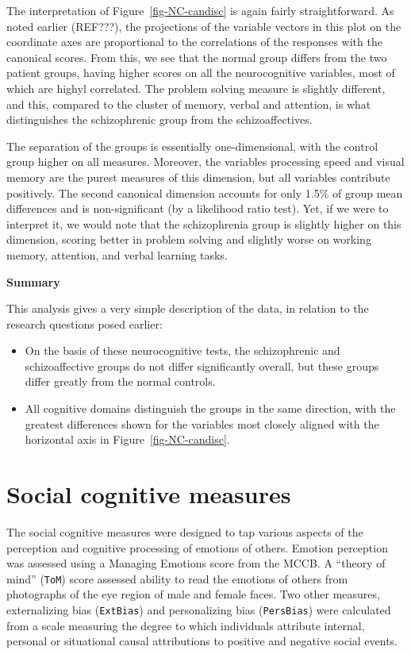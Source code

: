\documentclass[
  letterpaper,
  10pt,
  krantz2]{krantz}
\begin{document}
The interpretation of Figure~\ref{fig-NC-candisc} is again fairly
straightforward. As noted earlier (REF???), the projections of the
variable vectors in this plot on the coordinate axes are proportional to
the correlations of the responses with the canonical scores. From this,
we see that the normal group differs from the two patient groups, having
higher scores on all the neurocognitive variables, most of which are
highyl correlated. The problem solving measure is slightly different,
and this, compared to the cluster of memory, verbal and attention, is
what distinguishes the schizophrenic group from the schizoaffectives.

The separation of the groups is essentially one-dimensional, with the
control group higher on all measures. Moreover, the variables processing
speed and visual memory are the purest measures of this dimension, but
all variables contribute positively. The second canonical dimension
accounts for only 1.5\% of group mean differences and is non-significant
(by a likelihood ratio test). Yet, if we were to interpret it, we would
note that the schizophrenia group is slightly higher on this dimension,
scoring better in problem solving and slightly worse on working memory,
attention, and verbal learning tasks.

\textbf{Summary}

This analysis gives a very simple description of the data, in relation
to the research questions posed earlier:

\begin{itemize}
\item
  On the basis of these neurocognitive tests, the schizophrenic and
  schizoaffective groups do not differ significantly overall, but these
  groups differ greatly from the normal controls.
\item
  All cognitive domains distinguish the groups in the same direction,
  with the greatest differences shown for the variables most closely
  aligned with the horizontal axis in Figure~\ref{fig-NC-candisc}.
\end{itemize}

\section{Social cognitive measures}\label{social-cognitive-measures}

The social cognitive measures were designed to tap various aspects of
the perception and cognitive processing of emotions of others. Emotion
perception was assessed using a Managing Emotions score from the MCCB. A
``theory of mind'' (\texttt{ToM}) score assessed ability to read the
emotions of others from photographs of the eye region of male and female
faces. Two other measures, externalizing bias (\texttt{ExtBias}) and
personalizing bias (\texttt{PersBias}) were calculated from a scale
measuring the degree to which individuals attribute internal, personal
or situational causal attributions to positive and negative social
events.
\end{document}
